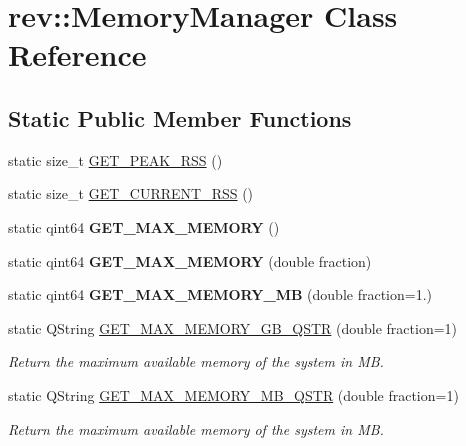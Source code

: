 \hypertarget{classrev_1_1_memory_manager}{}\section{rev\+::Memory\+Manager Class Reference}
\label{classrev_1_1_memory_manager}
\subsection*{Static Public Member Functions}
\begin{DoxyCompactItemize}
\item 
static size\+\_\+t \mbox{\hyperlink{classrev_1_1_memory_manager_a10f2830d7afcd47dd9f2290602b7b5f4}{G\+E\+T\+\_\+\+P\+E\+A\+K\+\_\+\+R\+SS}} ()
\item 
static size\+\_\+t \mbox{\hyperlink{classrev_1_1_memory_manager_a599246d380e0d127a069076b706d6c86}{G\+E\+T\+\_\+\+C\+U\+R\+R\+E\+N\+T\+\_\+\+R\+SS}} ()
\item 
\mbox{\label{classrev_1_1_memory_manager_a2ed9e3aa636cb48b6296d1b4bb7fbdb2}} 
static qint64 {\bfseries G\+E\+T\+\_\+\+M\+A\+X\+\_\+\+M\+E\+M\+O\+RY} ()
\item 
\mbox{\label{classrev_1_1_memory_manager_aea373e57f395e14eb41e85b4bd23dd35}} 
static qint64 {\bfseries G\+E\+T\+\_\+\+M\+A\+X\+\_\+\+M\+E\+M\+O\+RY} (double fraction)
\item 
\mbox{\label{classrev_1_1_memory_manager_ae7d5962983f4cf2577449d93d0be031c}} 
static qint64 {\bfseries G\+E\+T\+\_\+\+M\+A\+X\+\_\+\+M\+E\+M\+O\+R\+Y\+\_\+\+MB} (double fraction=1.)
\item 
static Q\+String \mbox{\hyperlink{classrev_1_1_memory_manager_aaee5207169db829d2e942f54c83cd138}{G\+E\+T\+\_\+\+M\+A\+X\+\_\+\+M\+E\+M\+O\+R\+Y\+\_\+\+G\+B\+\_\+\+Q\+S\+TR}} (double fraction=1)
\begin{DoxyCompactList}\small\item\em Return the maximum available memory of the system in MB. \end{DoxyCompactList}\item 
static Q\+String \mbox{\hyperlink{classrev_1_1_memory_manager_a777e4d9a3e92912ea698838bdd631f3c}{G\+E\+T\+\_\+\+M\+A\+X\+\_\+\+M\+E\+M\+O\+R\+Y\+\_\+\+M\+B\+\_\+\+Q\+S\+TR}} (double fraction=1)
\begin{DoxyCompactList}\small\item\em Return the maximum available memory of the system in MB. \end{DoxyCompactList}\end{DoxyCompactItemize}



